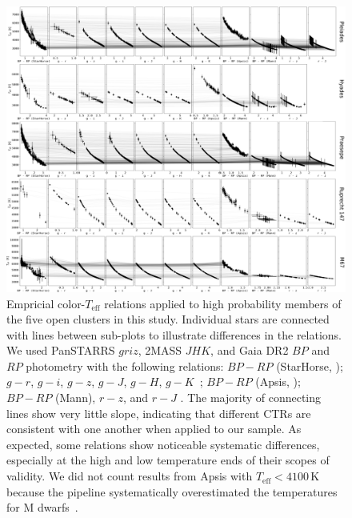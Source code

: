 \documentclass{aa}
\begin{document}
   \begin{figure}
		\centering
           \includegraphics[angle=90, width=\hsize]{pics/clusters/Teff_spread_all.png}

      \caption{Empricial color-$T_\mathrm{eff}$ relations applied to high probability members of the five open clusters in this study. Individual stars are connected with lines between sub-plots to illustrate differences in the relations. We used PanSTARRS $griz$, 2MASS $JHK$, and Gaia DR2 $BP$ and $RP$ photometry with the following relations: $BP-RP$ (StarHorse, \citealt{anders_starhorse_2019}); $g-r$, $g-i$, $g-z$, $g-J$, $g-H$, $g-K$~\citep{boyajian_stellar_2013}; $BP-RP$ (Apsis, \citealt{andrae_gaiaapsis_2018}); $BP-RP$ (Mann), $r-z$, and $r-J$ \citep{mann_erratum_2016}. The majority of connecting lines show very little slope, indicating that different CTRs are consistent with one another when applied to our sample. As expected, some relations show noticeable systematic differences, especially at the high and low temperature ends of their scopes of validity. We did not count results from Apsis with $T_\mathrm{eff}<4100\,$K because the pipeline systematically overestimated the temperatures for M dwarfs~\citep{andrae_gaiaapsis_2018,kesseli2019}.}
         \label{fig:teff_spread}
   \end{figure}
\end{document}
